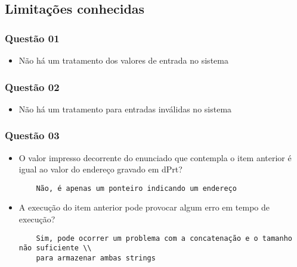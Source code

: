 \documentclass[11pt,a4paper]{article}
\begin{document}
\subsection{Limitações conhecidas}
\subsubsection{Questão 01}
\begin{itemize}
  \item Não há um tratamento dos valores de entrada no sistema
\end{itemize}

\subsubsection{Questão 02}
\begin{itemize}
  \item Não há um tratamento para entradas inválidas no sistema
\end{itemize}

\subsubsection{Questão 03}
\begin{itemize}
\item
O valor impresso decorrente do enunciado que contempla o item anterior é igual ao
valor do endereço gravado em dPrt?
\begin{verbatim}
    Não, é apenas um ponteiro indicando um endereço
    \end{verbatim}

\item
  A execução do item anterior pode provocar algum erro em tempo de execução?
\begin{verbatim}
    Sim, pode ocorrer um problema com a concatenação e o tamanho não suficiente \\
    para armazenar ambas strings
\end{verbatim}



\end{itemize}
\end{document}
